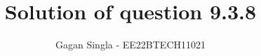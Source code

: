 \documentclass[journal,12pt,twocolumn]{IEEEtran}
\theoremstyle{remark}
\begin{document}
%




\vspace{3cm}

\title{
Solution of question 9.3.8
}
\author{ Gagan Singla - EE22BTECH11021
	
}	


%
%
%

% 
%



% 
\end{document}
